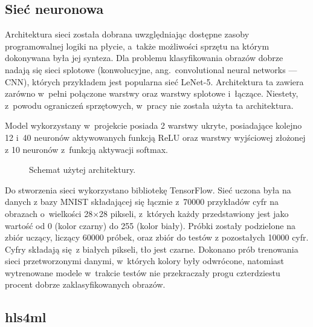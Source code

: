 \documentclass[12pt, oneside, a4paper]{article}
\begin{document}
\newpage
\subsection{Sieć neuronowa}\label{sec:Siec neuronowa}
Architektura sieci została dobrana uwzględniając dostępne zasoby programowalnej
logiki na płycie, a~także możliwości sprzętu na którym dokonywana była jej
synteza. Dla problemu klasyfikowania obrazów dobrze nadają się sieci
splotowe (konwolucyjne, ang.\ convolutional neural networks --- CNN), 
których przykładem jest popularna sieć \mbox{LeNet-5}.\cite{lecun98}
Architektura ta zawiera zarówno w~pełni połączone warstwy
oraz warstwy splotowe i~łączące.
Niestety, z~powodu ograniczeń sprzętowych, w~pracy nie została użyta ta
architektura.

Model wykorzystany w~projekcie posiada 2 warstwy ukryte, posiadające kolejno
12 i~40 neuronów aktywowanych funkcją ReLU oraz warstwy wyjściowej złożonej
z 10 neuronów z~funkcją aktywacji softmax.
\begin{figure}[h]
\hspace{2cm}
  \centering
  
  \caption{Schemat użytej architektury.
  }\label{fig:nn-scheme}
\end{figure}

Do stworzenia sieci wykorzystano
bibliotekę TensorFlow. Sieć uczona była na danych
z bazy MNIST\cite{mnist} składającej się łącznie z~70000 przykładów
cyfr na obrazach o~wielkości 28\(\times \)28 pikseli, z~których każdy
przedstawiony jest jako wartość od 0 (kolor czarny) do 255 (kolor biały).
Próbki zostały
podzielone na zbiór uczący, liczący 60000 próbek, oraz zbiór do testów
z pozostałych 10000 cyfr. Cyfry składają się z białych pikseli, tło jest czarne.
Dokonano prób trenowania sieci przetworzonymi danymi, w~których kolory były
odwrócone, natomiast wytrenowane modele w~trakcie testów nie przekraczały
progu czterdziestu procent dobrze zaklasyfikowanych obrazów.

\newpage
\subsection{hls4ml}\label{sec:hls4ml}
\end{document}
